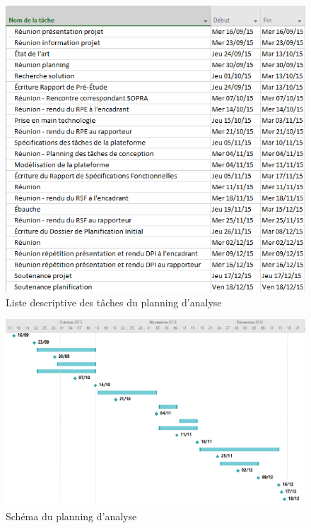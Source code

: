     \begin{figure}[ht!]
        \centering
        \includegraphics[width=1\textwidth]{figure/planning_description.png}
        \caption{Liste descriptive des tâches du planning d'analyse}
        \label{fig:description}
    \end{figure}

    \begin{figure}[ht!]
        \centering
        \includegraphics[width=1\textwidth]{figure/planning_schema.png}
        \caption{Schéma du planning d'analyse}
        \label{fig:schema}
    \end{figure}


